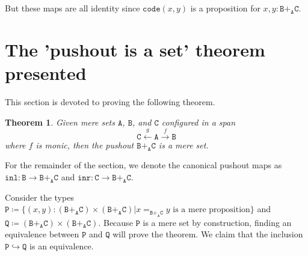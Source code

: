 \documentclass[12pt]{amsart}
\newcommand{\from}{\colon}
\newcommand{\xto}[1]{\xrightarrow{#1}}
\newcommand{\xgets}[1]{\xleftarrow{#1}}
\newcommand{\bydef}{\coloneqq}
\newcommand{\type}[1]{\mathtt{#1}}
\newcommand{\tin}{\colon}
\newcommand{\A}{\type{A}}
\newcommand{\B}{\type{B}}
\newcommand{\C}{\type{C}}
\renewcommand{\P}{\type{P}}
\newcommand{\Q}{\type{Q}}
\newcommand{\BAC}{\B +_{\A} \C}
\newcommand{\inl}{\type{inl}}
\newcommand{\inr}{\type{inr}}
\newcommand{\code}{\type{code}}
\newtheorem{thm}{Theorem}
\theoremstyle{remark}
\theoremstyle{definition}
\begin{document}
But these maps are all identity since \( \code (x,y) \) is a
proposition for \( x,y \tin \BAC \).   


\section{The 'pushout is a set' theorem presented}

This section is devoted to proving the following theorem.

\begin{thm} \label{thm:pushout-is-set}
  Given mere sets \( \A \), \( \B \), and \( \C \) configured in a
  span
  \[
    \C \xgets{g} \A \xto{f} \B
  \]
  where \( f \) is monic, then the pushout \( \BAC \) is a mere set.
\end{thm}

For the remainder of the section, we denote the canonical pushout maps
as
%
\(
  \inl \from \B \to \BAC
\)
%  
and
%
\(
  \inr \from \C \to \BAC.
\)
%
\par

Consider the types
%
\(
  \P \bydef
  \{ (x,y) \tin ( \BAC ) \times ( \BAC ) \vert
  x =_{\BAC} y \text{ is a mere proposition} \}
\)
%
and 
%
\(
  \Q \bydef (\BAC) \times (\BAC).
\)
%
Because \( \P \) is a mere set
by construction, finding an equivalence between \( \P \) and \( \Q \)
will prove the theorem.  We claim that the inclusion
%
\(
  \P \hookrightarrow \Q
\)
%
is an equivalence. 

\end{document}
